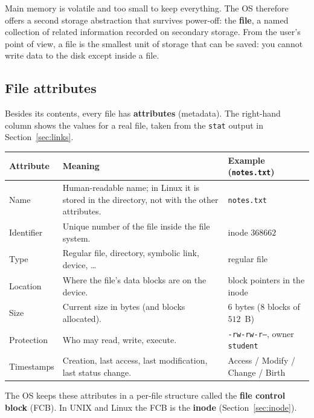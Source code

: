 \documentclass[11pt,a4paper]{article}
\newcommand{\term}[1]{\textbf{\color{mintdeep}#1}}
\newcommand{\cmd}[1]{\texttt{#1}}
\begin{document}
Main memory is volatile and too small to keep everything. The OS therefore offers a second storage abstraction that survives power-off: the \term{file}, a named collection of related information recorded on secondary storage. From the user's point of view, a file is the smallest unit of storage that can be saved: you cannot write data to the disk except inside a file.

\subsection{File attributes}

Besides its contents, every file has \term{attributes} (metadata). The right-hand column shows the values for a real file, taken from the \cmd{stat} output in Section~\ref{sec:links}.

\begin{center}
\renewcommand{\arraystretch}{1.3}
\begin{tabularx}{\linewidth}{>{\raggedright\arraybackslash}p{2.3cm} >{\raggedright\arraybackslash}X >{\raggedright\arraybackslash}p{4.4cm}}
\toprule
\textbf{Attribute} & \textbf{Meaning} & \textbf{Example (\texttt{notes.txt})} \\
\midrule
Name & Human-readable name; in Linux it is stored in the directory, not with the other attributes. & \texttt{notes.txt} \\
Identifier & Unique number of the file inside the file system. & inode $368662$ \\
Type & Regular file, directory, symbolic link, device, \dots & regular file \\
Location & Where the file's data blocks are on the device. & block pointers in the inode \\
Size & Current size in bytes (and blocks allocated). & $6$ bytes ($8$ blocks of $512$~B) \\
Protection & Who may read, write, execute. & \texttt{-rw-rw-r--}, owner \texttt{student} \\
Timestamps & Creation, last access, last modification, last status change. & Access / Modify / Change / Birth \\
\bottomrule
\end{tabularx}
\end{center}

The OS keeps these attributes in a per-file structure called the \term{file control block} (FCB). In UNIX and Linux the FCB is the \term{inode} (Section~\ref{sec:inode}).
\end{document}
